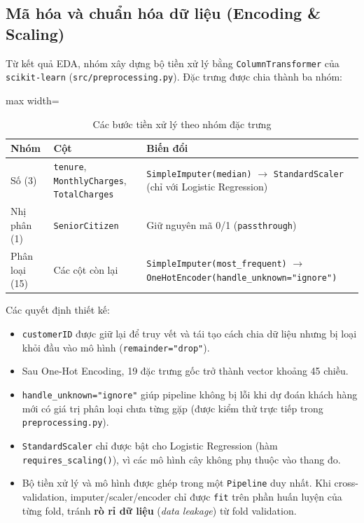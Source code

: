 \subsection{Mã hóa và chuẩn hóa dữ liệu (Encoding \& Scaling)}
Từ kết quả EDA, nhóm xây dựng bộ tiền xử lý bằng \texttt{ColumnTransformer} của \texttt{scikit-learn} (\texttt{src/preprocessing.py}). Đặc trưng được chia thành ba nhóm:

\begin{table}[H]
\centering
\begin{adjustbox}{max width=\textwidth}
\begin{tabular}{|p{3.2cm}|p{5.5cm}|p{6.5cm}|}
\hline
\textbf{Nhóm} & \textbf{Cột} & \textbf{Biến đổi} \\
\hline
Số (3) & \texttt{tenure}, \texttt{MonthlyCharges}, \texttt{TotalCharges} & \texttt{SimpleImputer(median)} $\rightarrow$ \texttt{StandardScaler} (chỉ với Logistic Regression) \\
\hline
Nhị phân (1) & \texttt{SeniorCitizen} & Giữ nguyên mã 0/1 (\texttt{passthrough}) \\
\hline
Phân loại (15) & Các cột còn lại & \texttt{SimpleImputer(most\_frequent)} $\rightarrow$ \texttt{OneHotEncoder(}\newline\texttt{handle\_unknown="ignore")} \\
\hline
\end{tabular}
\end{adjustbox}
\caption{Các bước tiền xử lý theo nhóm đặc trưng}
\end{table}


Các quyết định thiết kế:
\begin{itemize}
    \item \texttt{customerID} được giữ lại để truy vết và tái tạo cách chia dữ liệu nhưng bị loại khỏi đầu vào mô hình (\texttt{remainder="drop"}).
    \item Sau One-Hot Encoding, 19 đặc trưng gốc trở thành vector khoảng 45 chiều.
    \item \texttt{handle\_unknown="ignore"} giúp pipeline không bị lỗi khi dự đoán khách hàng mới có giá trị phân loại chưa từng gặp (được kiểm thử trực tiếp trong \texttt{preprocessing.py}).
    \item \texttt{StandardScaler} chỉ được bật cho Logistic Regression (hàm \texttt{requires\_scaling()}), vì các mô hình cây không phụ thuộc vào thang đo.
    \item Bộ tiền xử lý và mô hình được ghép trong một \texttt{Pipeline} duy nhất. Khi cross-validation, imputer/scaler/encoder chỉ được \texttt{fit} trên phần huấn luyện của từng fold, tránh \textbf{rò rỉ dữ liệu} (\textit{data leakage}) từ fold validation.
\end{itemize}

